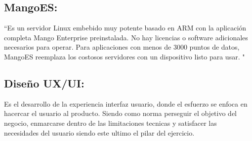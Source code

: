 \subsection{MangoES:} ``Es un servidor Linux embebido muy potente basado en ARM con la aplicación completa Mango Enterprise preinstalada. No hay licencias o software adicionales necesarios para operar. Para aplicaciones con menos de 3000 puntos de datos, MangoES reemplaza los costosos servidores con un dispositivo listo para usar. "\textcolor{blue}{\cite{MANGO}}
    
\subsection{Diseño UX/UI:} Es el desarrollo de la experiencia interfaz usuario, donde el esfuerzo se enfoca en hacercar el usuario 
al producto. Siendo como norma perseguir el objetivo del negocio, enmarcarse dentro de las limitaciones tecnicas y satisfacer las
necesidades del usuario siendo este ultimo el pilar del ejercicio.\textcolor{blue}{\cite{AdobeXD}} \textcolor{blue}{\cite{UI}} 

\newpage
